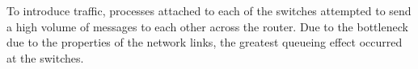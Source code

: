 To introduce traffic, processes attached to each of the switches attempted to send a high volume of messages to each other across the router.
Due to the bottleneck due to the properties of the network links, the greatest queueing effect occurred at the switches.

